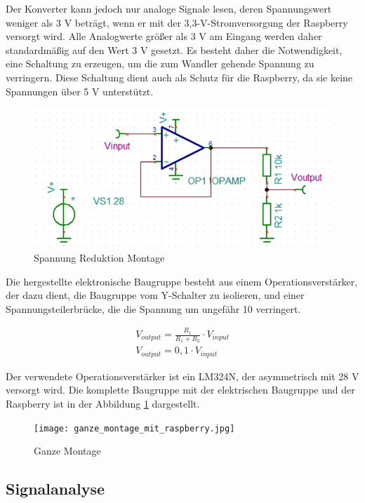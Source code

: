 \documentclass[12pt,a4paper]{scrartcl}
\numberwithin{equation}{section}
\begin{document}

Der Konverter kann jedoch nur analoge Signale lesen, deren Spannungswert weniger als 3 V beträgt, wenn er mit der 3,3-V-Stromversorgung der Raspberry versorgt wird. Alle Analogwerte größer als 3 V am Eingang werden daher standardmäßig auf den Wert 3 V gesetzt. Es besteht daher die Notwendigkeit, eine Schaltung zu erzeugen, um die zum Wandler gehende Spannung zu verringern. Diese Schaltung dient auch als Schutz für die Raspberry, da sie keine Spannungen über 5 V unterstützt. 

\begin{figure}[ht!]
	\centering
	  \includegraphics[scale=0.5]{montage.png}
	  \caption{Spannung Reduktion Montage}
\end{figure}

Die hergestellte elektronische Baugruppe besteht aus einem Operationsverstärker, der dazu dient, die Baugruppe vom Y-Schalter zu isolieren, und einer Spannungsteilerbrücke, die die Spannung um ungefähr 10 verringert. 

\begin{align}
V_{output} = \frac{R_{1}}{R_{1} + R_{2}} \cdot V_{input} \\
V_{output} = 0,1 \cdot V_{input} \nonumber
\label{eq:}
\end{align}

Der verwendete Operationsverstärker ist ein LM324N, der asymmetrisch mit 28 V versorgt wird. Die komplette Baugruppe mit der elektrischen Baugruppe und der Raspberry ist in der Abbildung \ref{montage} dargestellt. 

\begin{figure}[ht!]
	\centering
	  \texttt{[image: ganze\_montage\_mit\_raspberry.jpg]}
	  \caption{Ganze Montage}
	\label{montage}
\end{figure}

\subsection{Signalanalyse}
\end{document}
